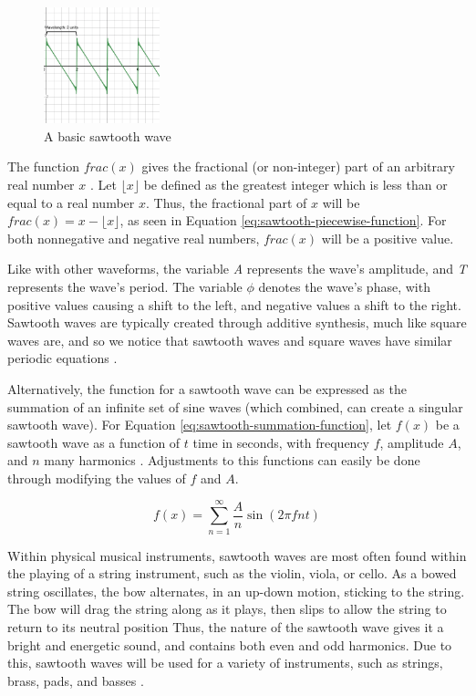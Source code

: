 \begin{figure}[ht]
  \centering
  \includegraphics[width=0.3\textwidth]{figures/sawtooth-wave.png}
  \caption{A basic sawtooth wave}
  \label{fig:basic-sawtooth-wave}
\end{figure}

The function $frac(x)$ gives the fractional (or non-integer) part of an arbitrary real number $x$ \cite{Weisstein}. Let $\lfloor x \rfloor$ be defined as the greatest integer which is less than or equal to a real number $x$. Thus, the fractional part of $x$ will be $frac(x) = x - \lfloor x \rfloor$, as seen in Equation \ref{eq:sawtooth-piecewise-function}. For both nonnegative and negative real numbers, $frac(x)$ will be a positive value.

Like with other waveforms, the variable \textit{A} represents the wave's amplitude, and \textit{T} represents the wave's period. The variable $\phi$ denotes the wave's phase, with positive values causing a shift to the left, and negative values a shift to the right. Sawtooth waves are typically created through additive synthesis, much like square waves are, and so we notice that sawtooth waves and square waves have similar periodic equations \cite{Tarr_2019}.

Alternatively, the function for a sawtooth wave can be expressed as the summation of an infinite set of sine waves (which combined, can create a singular sawtooth wave). For Equation \ref{eq:sawtooth-summation-function}, let $f(x)$ be a sawtooth wave as a function of $t$ time in seconds, with frequency $f$, amplitude $A$, and $n$ many harmonics \cite{Wellesley_College_Staff_2021}. Adjustments to this functions can easily be done through modifying the values of $f$ and $A$.

\begin{equation}
	f(x) = \sum_{n=1}^{\infty} \frac{A}{n}\sin(2\pi fnt)
	\label{eq:sawtooth-summation-function}
\end{equation}

Within physical musical instruments, sawtooth waves are most often found within the playing of a string instrument, such as the violin, viola, or cello. As a bowed string oscillates, the bow alternates, in an up-down motion, sticking to the string. The bow will drag the string along as it plays, then slips to allow the string to return to its neutral position \cite{Kapur_Cook_Salazar_Wang_2015} Thus, the nature of the sawtooth wave gives it a bright and energetic sound, and contains both even and odd harmonics. Due to this, sawtooth waves will be used for a variety of instruments, such as strings, brass, pads, and basses \cite{Dowsett_2016}. 


